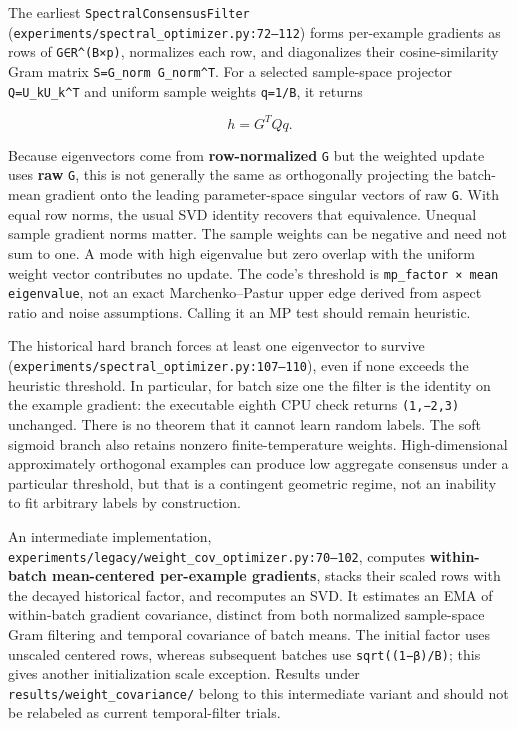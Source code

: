 \documentclass[
  british,
  10pt,
  a4paper,
]{article}
\newcounter{none} %
\begin{document}
The earliest \texttt{SpectralCons\allowbreak{}ensusFilter}
(\texttt{experiments/\allowbreak{}spectral\_\allowbreak{}optimizer.\allowbreak{}py:\allowbreak{}72–112})
forms per-\allowbreak{}example gradients as rows of
\texttt{G∈R\^{}(B×p)}, normalizes each row, and diagonalizes their
cosine-\allowbreak{}similarity Gram matrix
\texttt{S=\allowbreak{}G\_\allowbreak{}norm \allowbreak{}G\_\allowbreak{}norm\textasciicircum{}T}.
For a selected sample-\allowbreak{}space projector
\texttt{Q=U\_kU\_k\^{}T} and uniform sample weights \texttt{q=1/B}, it
returns

\[
h=G^TQq.
\]

Because eigenvectors come from \textbf{row-\allowbreak{}normalized}
\texttt{G} but the weighted update uses \textbf{raw} \texttt{G}, this is
not generally the same as orthogonally projecting the batch-mean
gradient onto the leading parameter-\allowbreak{}space singular vectors
of raw \texttt{G}. With equal row norms, the usual SVD identity recovers
that equivalence.\allowbreak{} Unequal sample gradient norms matter. The
sample weights can be negative and need not sum to one. A mode with high
eigenvalue but zero overlap with the uniform weight vector contributes
no update. The code's threshold is
\texttt{mp\_\allowbreak{}factor \allowbreak{}× \allowbreak{}mean \allowbreak{}eigenvalue},
not an exact Marchenko--Pastur upper edge derived from aspect ratio and
noise assumptions.\allowbreak{} Calling it an MP test should remain
heuristic.

The historical hard branch forces at least one eigenvector to survive
(\texttt{experiments/\allowbreak{}spectral\_\allowbreak{}optimizer.\allowbreak{}py:\allowbreak{}107–110}),
even if none exceeds the heuristic threshold. In
particular,\allowbreak{} for batch size one the filter is the identity
on the example gradient: the executable eighth CPU check returns
\texttt{(1,−2,3)} unchanged. There is no theorem that it cannot learn
random labels. The soft sigmoid branch also retains nonzero
finite-\allowbreak{}temperature weights. High-\allowbreak{}dimensional
approximately orthogonal examples can produce low aggregate consensus
under a particular threshold, but that is a contingent geometric regime,
not an inability to fit arbitrary labels by
construction\allowbreak{}.\allowbreak{}

An intermediate implementati\allowbreak{}on,\allowbreak{}
\texttt{experiments/\allowbreak{}legacy/\allowbreak{}weight\_\allowbreak{}cov\_\allowbreak{}optimizer.\allowbreak{}py:\allowbreak{}70–102},
computes \textbf{within-\allowbreak{}batch mean-\allowbreak{}centered
per-\allowbreak{}example gradients}, stacks their scaled rows with the
decayed historical factor, and recomputes an SVD. It estimates an EMA of
within-\allowbreak{}batch gradient covariance,\allowbreak{} distinct
from both normalized sample-\allowbreak{}space Gram filtering and
temporal covariance of batch means. The initial factor uses unscaled
centered rows, whereas subsequent batches use
\texttt{sqrt((1−β)/\allowbreak{}B)}; this gives another initialization
scale exception. Results under
\texttt{results/\allowbreak{}weight\_\allowbreak{}covariance/\allowbreak{}}
belong to this intermediate variant and should not be relabeled as
current temporal-\allowbreak{}filter trials.
\end{document}
